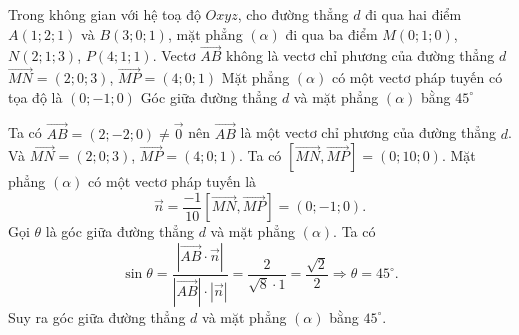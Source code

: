 \begin{ex}%
    Trong không gian với hệ toạ độ $Oxyz$, cho đường thẳng $d$ đi qua hai điểm $A(1; 2; 1)$ và $B(3; 0; 1)$, mặt phẳng $(\alpha)$ đi qua ba điểm $M(0; 1; 0)$, $N(2; 1; 3)$, $P(4; 1; 1)$.
    \choiceTF
    {Vectơ $\overrightarrow{AB}$ không là vectơ chỉ phương của đường thẳng $d$}
    {\True $\overrightarrow{MN} = (2; 0; 3)$, $\overrightarrow{MP} = (4; 0; 1)$}
    {\True Mặt phẳng $(\alpha)$ có một vectơ pháp tuyến có tọa độ là $(0; -1; 0)$}
    {\True Góc giữa đường thẳng $d$ và mặt phẳng $(\alpha)$ bằng $45^\circ$}
    \loigiai
    {\begin{itemchoice}
            \itemch Ta có $\overrightarrow{AB} = (2; -2; 0)\ne \overrightarrow{0}$ nên $\overrightarrow{AB}$ là một vectơ chỉ phương của đường thẳng $d$.
            \itemch Và $\overrightarrow{MN} = (2; 0; 3)$, $\overrightarrow{MP} = (4; 0; 1)$.
            \itemch Ta có  $\left[\overrightarrow{MN}, \overrightarrow{MP}\right] = (0; 10; 0)$. Mặt phẳng $(\alpha)$ có một vectơ pháp tuyến là $$\overrightarrow{n}=\dfrac{-1}{10}\left[\overrightarrow{MN}, \overrightarrow{MP}\right] = (0; -1; 0).$$
            \itemch Gọi $\theta$ là góc giữa đường thẳng $d$ và mặt phẳng $(\alpha)$. Ta có
            \[
            \sin \theta = \dfrac{|\overrightarrow{AB} \cdot \overrightarrow{n}|}{|\overrightarrow{AB}| \cdot |\overrightarrow{n}|} = \dfrac{2}{\sqrt{8} \cdot 1} = \dfrac{\sqrt{2}}{2} \Rightarrow \theta = 45^\circ.
            \]
            Suy ra góc giữa đường thẳng $d$ và mặt phẳng $(\alpha)$ bằng $45^\circ$.
        \end{itemchoice}
    }
\end{ex}
